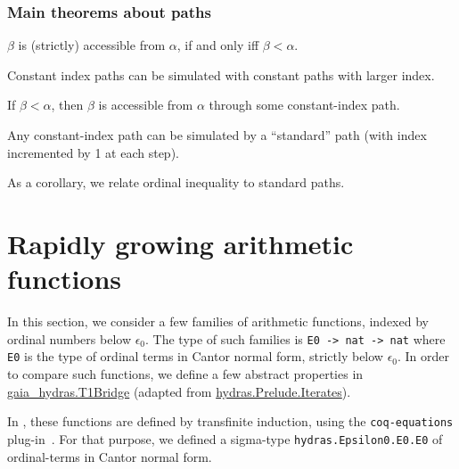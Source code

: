 \subsubsection{Main theorems about paths}

$\beta$ is (strictly) accessible from $\alpha$, if and only iff
$\beta<\alpha$.


Constant index paths can be simulated with constant paths with larger index.
 


If $\beta<\alpha$, then $\beta$ is accessible from $\alpha$
through some constant-index path.


Any constant-index path can be simulated by a ``standard'' path (with index incremented by 1 at each step).


As a corollary, we relate ordinal inequality to standard paths.





\section{Rapidly growing arithmetic functions}
In this section, we consider a few families of arithmetic functions, indexed by ordinal numbers below $\epsilon_0$.
The type of such families is \texttt{E0 -> nat -> nat} where
\texttt{E0} is the type of ordinal terms in Cantor normal form, strictly below $\epsilon_0$.
In order to compare such functions, we define a few abstract properties in
\href{../theories/html/gaia_hydras.T1Bridge.html}{gaia\_hydras.T1Bridge} (adapted from 
\href{../theories/html/hydras.Prelude.Iterates.html}{hydras.Prelude.Iterates}).









In \HydrasLib, these functions are defined by transfinite induction, using the \texttt{coq-equations} plug-in~\cite{sozeau:hal-01671777}. For that purpose, we defined a sigma-type
\texttt{hydras.Epsilon0.E0.E0} of ordinal-terms in Cantor normal form. 


